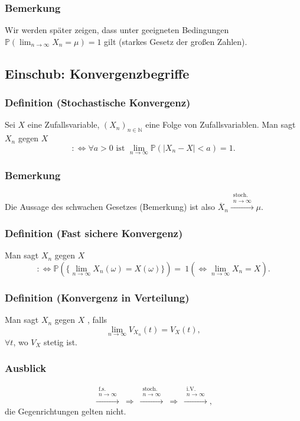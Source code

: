 \subsubsection{Bemerkung}
Wir werden sp\"ater zeigen, dass unter geeigneten Bedingungen $\mathbb{P}(\lim_{n\to\infty}X_n=\mu)=1$ gilt (starkes Gesetz der gro\ss{}en Zahlen).
\subsection{Einschub: Konvergenzbegriffe}
\subsubsection{Definition (Stochastische Konvergenz)}
Sei $X$ eine Zufallsvariable, $(X_n)_{n\in\mathbb{N}}$ eine Folge von Zufallsvariablen. Man sagt $X_n$  gegen $X$
\[
:\Leftrightarrow\forall a>0\text{ ist }\lim_{n\to\infty}\mathbb{P}(|X_n-X|<a)=1.
\]
\subsubsection{Bemerkung}
Die Aussage des schwachen Gesetzes (Bemerkung) ist also $\overline{X}_n\xrightarrow{\substack{\text{stoch.}\\n\to\infty}}\mu$.
\subsubsection{Definition (Fast sichere Konvergenz)}
Man sagt $X_n$  gegen $X$
\[
:\Leftrightarrow\mathbb{P}(\{\lim_{n\to\infty}X_n(\omega)=X(\omega)\})=\ 1(\Leftrightarrow\lim_{n\to\infty}X_n=X).
\]
\subsubsection{Definition (Konvergenz in Verteilung)}
Man sagt $X_n$  gegen $X$ , falls
\[
\lim_{n\to\infty}V_{X_n}(t)=V_X(t),
\]
$\forall t$, wo $V_X$ stetig ist.
\subsubsection{Ausblick}
\[
\xrightarrow{\substack{\text{f.s.}\\n\to\infty}}
\ \Rightarrow\ 
\xrightarrow{\substack{\text{stoch.}\\n\to\infty}}
\ \Rightarrow\ 
\xrightarrow{\substack{\text{i.V.}\\n\to\infty}},
\]
die Gegenrichtungen gelten nicht.
